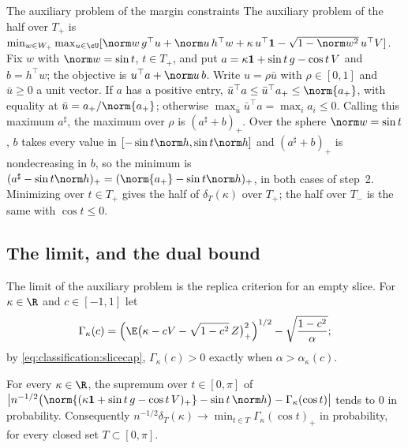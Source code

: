 \begin{refsection}
\begin{computation}{The auxiliary problem of the margin constraints}\label{comp:classification:ao}
\step The auxiliary problem of the half over $T_+$ is $\min_{w\in W_+}\max_{u\in\cU}[\norm w\,g^\top u+\norm u\,h^\top w+\kappa\,u^\top\classificationones-\sqrt{1-\norm w^2}\,u^\top V]$. Fix $w$ with $\norm w=\sin t$, $t\in T_+$, and put $a=\kappa\mathbf{1}+\sin t\,g-\cos t\,V$ and $b=h^\top w$; the objective is $u^\top a+\norm u\,b$.
\step Write $u=\rho\bar u$ with $\rho\in[0,1]$ and $\bar u\ge0$ a unit vector. If $a$ has a positive entry, $\bar u^\top a\le\bar u^\top a_+\le\norm{a_+}$, with equality at $\bar u=a_+/\norm{a_+}$; otherwise $\max_{\bar u}\bar u^\top a=\max_ia_i\le0$. Calling this maximum $a^\sharp$, the maximum over $\rho$ is $(a^\sharp+b)_+$.
\step Over the sphere $\norm w=\sin t$, $b$ takes every value in $[-\sin t\norm h,\sin t\norm h]$ and $(a^\sharp+b)_+$ is nondecreasing in $b$, so the minimum is $(a^\sharp-\sin t\norm h)_+=(\norm{a_+}-\sin t\norm h)_+$, in both cases of step~2.
\step Minimizing over $t\in T_+$ gives the half of $\delta_T(\kappa)$ over $T_+$; the half over $T_-$ is the same with $\cos t\le0$.
\end{computation}

\subsection{The limit, and the dual bound}

The limit of the auxiliary problem is the replica criterion for an empty slice. For $\kappa\in\R$ and $c\in[-1,1]$ let
\begin{equation}\label{eq:classification:Gamma}
\Gamma_\kappa(c)=\Bigl(\E\bigl(\kappa-cV-\sqrt{1-c^2}\,Z\bigr)_+^2\Bigr)^{1/2}-\sqrt{\frac{1-c^2}\alpha};
\end{equation}
by \eqref{eq:classification:slicecap}, $\Gamma_\kappa(c)>0$ exactly when $\alpha>\alpha_\kappa(c)$.

\begin{lemma}\label{lem:classification:lln}
For every $\kappa\in\R$, the supremum over $t\in[0,\pi]$ of $\bigl|n^{-1/2}\bigl(\norm{(\kappa\classificationones+\sin t\,g-\cos t\,V)_+}-\sin t\,\norm h\bigr)-\Gamma_\kappa(\cos t)\bigr|$ tends to $0$ in probability. Consequently $n^{-1/2}\delta_T(\kappa)\to\min_{t\in T}\Gamma_\kappa(\cos t)_+$ in probability, for every closed set $T\subset[0,\pi]$.
\end{lemma}


\end{refsection}
